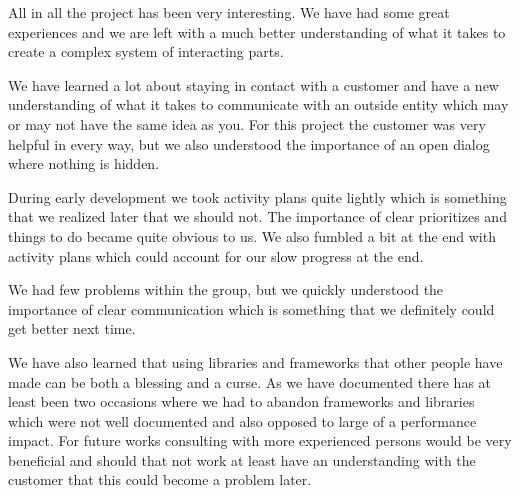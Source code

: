 All in all the project has been very interesting. We have had some great experiences and we are left with a much better understanding of what it takes to create a complex system of interacting parts.

We have learned a lot about staying in contact with a customer and have a new understanding of what it takes to communicate with an outside entity which may or may not have the same idea as you. For this project the customer was very helpful in every way, but we also understood the importance of an open dialog where nothing is hidden.

During early development we took activity plans quite lightly which is something that we realized later that we should not. The importance of clear prioritizes and things to do became quite obvious to us. We also fumbled a bit at the end with activity plans which could account for our slow progress at the end.

We had few problems within the group, but we quickly understood the importance of clear communication which is something that we definitely could get better next time.

We have also learned that using libraries and frameworks that other people have made can be both a blessing and a curse. As we have documented there has at least been two occasions where we had to abandon frameworks and libraries which were not well documented and also opposed to large of a performance impact. For future works consulting with more experienced persons would be very beneficial and should that not work at least have an understanding with the customer that this could become a problem later.
